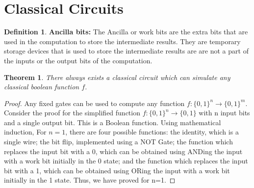 \documentclass[12pt, oneside]{book}
\newtheorem{theorem}{Theorem}[section]
\theoremstyle{definition}
\newtheorem{definition}{Definition}[section]
\theoremstyle{definition}
\theoremstyle{remark}
\begin{document}
\section{Classical Circuits}
\begin{definition}
    \textbf{Ancilla bits: }The Ancilla or work bits are the extra bits that are used in the computation 
to store the intermediate results. They are temporary storage devices
that is used to store the intermediate results are are not a part of the inputs 
or the output bits of the computation.
\end{definition}
\begin{theorem}
There always exists a classical circuit which can simulate any classical boolean function $f$.
\end{theorem}
\label{proof:classicalcomputations}
\begin{proof}
    Any fixed gates can be used to compute any function $f:\{0,1\}^n \rightarrow \{0,1\}^m$.
    Consider the proof for the simplified function $f:\{0,1\}^n \rightarrow \{0,1\}$ with n input bits
    and a single output bit. This is a Boolean function. Using mathematical induction, For $n=1$, there are four possible functions: the identity, which is 
    a single wire; the bit flip, implemented using a NOT Gate; the function which replaces the input bit with a 0, which can be obtained using ANDing the input 
    with a work bit initially in the 0 state; and the function which replaces the input bit with a 1, which can be obtained using ORing the input with a work bit initially in the 1 state.
    Thus, we have proved for n=1.
    

\end{proof}
\end{document}
